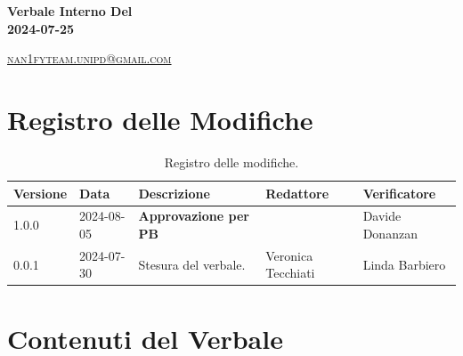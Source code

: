 \documentclass[8pt]{article}
\begin{document}
\begin{titlepage}
\begin{minipage}[t]{0.47\textwidth}
{		}
		\vspace{4mm}\vspace{4mm}
	\end{minipage}
	\vspace{4cm}
	\begin{center}
		\begin{flushright}
			{\fontsize{30pt}{52pt}\selectfont \textbf{Verbale Interno Del\\2024-07-25\\}} %
		\end{flushright}
		\vspace{3cm}
	\end{center}
	\vspace{8.5 cm}
	{\small \textsc{\href{mailto: nan1fyteam.unipd@gmail.com}{nan1fyteam.unipd@gmail.com}}}
\end{titlepage}
\pagestyle{mystyle}
\section*{Registro delle Modifiche}
\begin{table}[ht!]	
	\centering
	\begin{tabular}{p{1.2cm} p{2cm} p{5cm} p{3cm} p{3cm}}
		\toprule
		\textbf{Versione}& \textbf{Data} & \textbf{Descrizione} & \textbf{Redattore} & \textbf{Verificatore} \\
		\midrule
			1.0.0 & 2024-08-05 & \textbf{Approvazione per PB} & & Davide Donanzan \\
			0.0.1 & 2024-07-30 & Stesura del verbale. & Veronica Tecchiati & Linda Barbiero
 			\\ %

		\bottomrule
	\end{tabular}
	\caption{Registro delle modifiche.}
	\label{table:Registro delle modifiche}
\end{table}
\newpage
\tableofcontents
\clearpage
\newpage
\justifying
\section{Contenuti del Verbale}
\end{document}
